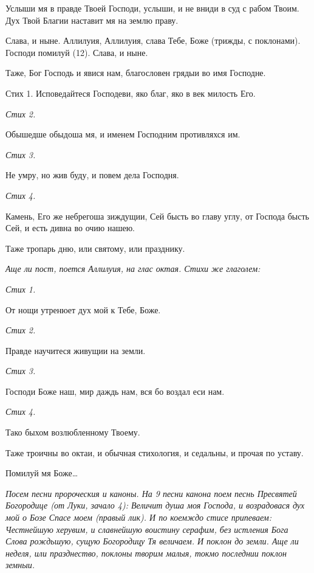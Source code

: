 Услыши мя в правде Твоей Господи, услыши, и не вниди в суд с рабом Твоим. Дух Твой Благии наставит мя на землю праву. 

Слава, и ныне. Аллилуия, Аллилуия, слава Тебе, Боже (трижды, с поклонами). Господи помилуй (12). Слава, и ныне. 

Таже, Бог Господь и явися нам, благословен грядыи во имя Господне.

Стих 1. Исповедайтеся Господеви, яко благ, яко в век милость Его.


\itshape Стих 2.\normalfont{}


Обышедше обыдоша мя, и именем Господним противляхся им.


\itshape Стих 3.\normalfont{}


Не умру, но жив буду, и повем дела Господня.


\itshape Стих 4.\normalfont{}


Камень, Его же небрегоша зиждущии, Сей бысть во главу углу, от Господа бысть Сей, и есть дивна во очию нашею. 

Таже тропарь дню, или святому, или празднику.


\itshape Аще ли пост, поется Аллилуия, на глас октая. Стихи же глаголем:\normalfont{}


\itshape Стих 1.\normalfont{}


От нощи утренюет дух мой к Тебе, Боже.


\itshape Стих 2.\normalfont{}


Правде научитеся живущии на земли.


\itshape Стих 3.\normalfont{}


Господи Боже наш, мир даждь нам, вся бо воздал еси нам.


\itshape Стих 4.\normalfont{}


Тако быхом возлюбленному Твоему.


Таже троичны во октаи, и обычная стихология, и седальны, и прочая по уставу.




Помилуй мя Боже…


\itshape Посем песни пророческия и каноны. На 9 песни канона поем песнь Пресвятей Богородице (от Луки, зачало 4):\normalfont{} Величит душа моя Господа, и возрадовася дух мой о Бозе Спасе моем (правый лик). И по коемждо стисе припеваем: Честнейшую херувим, и славнейшую воистину серафим, без истления Бога Слова рождьшую, сущую Богородицу Тя величаем. И поклон до земли. Аще ли неделя, или празднество, поклоны творим малыя, токмо последнии поклон земныи.

